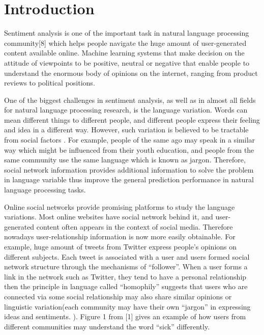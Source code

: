 
\section{Introduction}
Sentiment analysis is one of the important task in natural language processing community[8] which helps people navigate the huge amount of user-generated content available online. Machine learning systems that make decision on the attitude of viewpoints to be positive, neutral or negative that enable people to understand the enormous body of opinions on the internet, ranging from product reviews to political positions. 

One of the biggest challenges in sentiment analysis, as well as in almost all fields for natural language 
processing research, is the language variation. Words can mean different things to different people, 
and different people express their feeling and idea in a different way. However, such variation is believed
to be tractable from social factors \cite{yangyi}. For example, people of the same ago may speak in a
similar way \cite{Rosenthal} which might be influenced from their youth education, and people from the same community 
use the same language which is known as jargon. Therefore, social network information provides additional
information to solve the problem in language variable thus improve the general prediction performance
in natural language processing tasks.

Online social networks provide promising platforms to study the language variations. 
Most online websites have social network behind it, and user-generated content often appears in the context of social media. Therefore nowadays user-relationship information is now more easily obtainable. For example, huge amount of tweets from Twitter express people's opinions on different subjects. Each tweet is associated with a user and users formed social network structure through the mechanisms of ``follower''. When a user forms a link in the network such as Twitter, they tend to have a personal relationship then the principle in language called ``homophily'' suggests that users who are connected via some social relationship may also share similar opinions or linguistic variation(each community may have their own ``jargon'' in expressing ideas and sentiments. ). Figure 1 from [1] gives an example of how users from different communities may understand the word ``sick'' differently.

